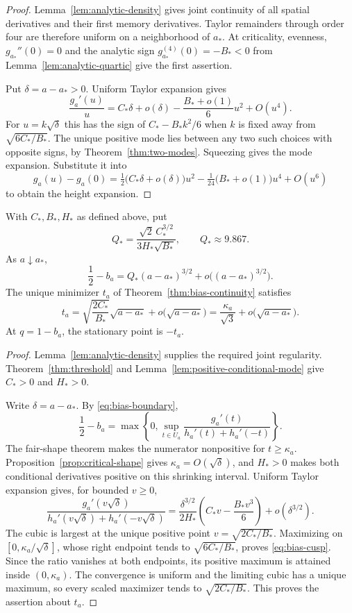 \begin{proof}
Lemma~\ref{lem:analytic-density} gives joint continuity of all spatial
derivatives and their first memory derivatives. Taylor remainders
through order four are therefore uniform on a neighborhood of $a_*$.
At criticality, evenness, $g_{a_*}''(0)=0$ and the analytic sign
$g_{a_*}^{(4)}(0)=-B_*<0$ from Lemma~\ref{lem:analytic-quartic}
give the first assertion.

Put $\delta=a-a_*>0$. Uniform Taylor expansion gives
\[
 \frac{g_a'(u)}u=C_*\delta+o(\delta)
                  -\frac{B_*+o(1)}6u^2+O(u^4).
\]
For $u=k\sqrt\delta$ this has the sign of $C_*-B_*k^2/6$
when $k$ is fixed away from $\sqrt{6C_*/B_*}$. The unique positive
mode lies between any two such choices with opposite signs, by
Theorem~\ref{thm:two-modes}. Squeezing gives the mode expansion.
Substitute it into
\[
 g_a(u)-g_a(0)=\tfrac12\bigl(C_*\delta+o(\delta)\bigr)u^2
                  -\tfrac1{24}\bigl(B_*+o(1)\bigr)u^4+O(u^6)
\]
to obtain the height expansion.
\end{proof}

\begin{proposition}\label{prop:bias-cusp}
With $C_*,B_*,H_*$ as defined above, put
\[
 Q_* = \frac{\sqrt{2}\,C_*^{3/2}}{3H_*\sqrt{B_*}},
 \qquad Q_*\approx9.867.
\]
As $a\downarrow a_*$,
\begin{equation}\label{eq:bias-cusp}
 \frac12-b_a=Q_*(a-a_*)^{3/2}+o\bigl((a-a_*)^{3/2}\bigr).
\end{equation}
The unique minimizer $t_a$ of
Theorem~\ref{thm:bias-continuity} satisfies
\[
 t_a=\sqrt{\frac{2C_*}{B_*}}\sqrt{a-a_*}
       +o\bigl(\sqrt{a-a_*}\bigr)
     =\frac{\kappa_a}{\sqrt3}+o\bigl(\sqrt{a-a_*}\bigr).
\]
At $q=1-b_a$, the stationary point is $-t_a$.
\end{proposition}

\begin{proof}
Lemma~\ref{lem:analytic-density} supplies the required joint regularity.
Theorem~\ref{thm:threshold} and
Lemma~\ref{lem:positive-conditional-mode} give $C_*>0$ and $H_*>0$.

Write $\delta=a-a_*$. By \eqref{eq:bias-boundary},
\[
 \frac12-b_a=\max\left\{0,\sup_{t\in U_a}
     \frac{g_a'(t)}{h_a'(t)+h_a'(-t)}\right\}.
\]
The fair-shape theorem makes the numerator nonpositive for $t\ge \kappa_a$.
Proposition~\ref{prop:critical-shape} gives
$\kappa_a=O(\sqrt\delta)$, and $H_*>0$ makes both conditional derivatives
positive on this shrinking interval. Uniform Taylor expansion gives,
for bounded $v\ge0$,
\[
 \frac{g_a'(v\sqrt\delta)}{h_a'(v\sqrt\delta)+h_a'(-v\sqrt\delta)}
 =\frac{\delta^{3/2}}{2H_*}
       \left(C_*v-\frac{B_*v^3}{6}\right)+o(\delta^{3/2}).
\]
The cubic is largest at the unique positive point
$v=\sqrt{2C_*/B_*}$. Maximizing on $[0,\kappa_a/\sqrt\delta]$, whose
right endpoint tends to $\sqrt{6C_*/B_*}$, proves \eqref{eq:bias-cusp}.
Since the ratio vanishes at both endpoints, its positive maximum
is attained inside $(0,\kappa_a)$. The convergence is uniform
and the limiting cubic has a unique maximum, so every scaled
maximizer tends to
$\sqrt{2C_*/B_*}$. This proves the assertion about $t_a$.


\end{proof}

